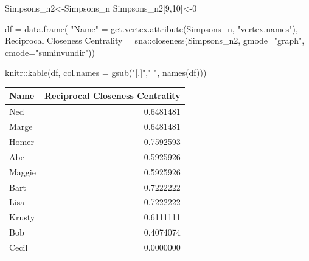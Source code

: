 \documentclass[
  notitlepage,
  onecolumn,
  openany]{book}
\newenvironment{Shaded}{\begin{snugshade}}{\end{snugshade}}
\newcommand{\AttributeTok}[1]{\textcolor[rgb]{0.77,0.63,0.00}{#1}}
\newcommand{\DecValTok}[1]{\textcolor[rgb]{0.00,0.00,0.81}{#1}}
\newcommand{\FunctionTok}[1]{\textcolor[rgb]{0.00,0.00,0.00}{#1}}
\newcommand{\NormalTok}[1]{#1}
\newcommand{\OtherTok}[1]{\textcolor[rgb]{0.56,0.35,0.01}{#1}}
\newcommand{\SpecialCharTok}[1]{\textcolor[rgb]{0.00,0.00,0.00}{#1}}
\newcommand{\StringTok}[1]{\textcolor[rgb]{0.31,0.60,0.02}{#1}}
\begin{document}
\begin{Shaded}
\begin{Highlighting}[]
\NormalTok{Simpsons\_n2}\OtherTok{\textless{}{-}}\NormalTok{Simpsons\_n}
\NormalTok{Simpsons\_n2[}\DecValTok{9}\NormalTok{,}\DecValTok{10}\NormalTok{]}\OtherTok{\textless{}{-}}\DecValTok{0}

\NormalTok{df }\OtherTok{=} \FunctionTok{data.frame}\NormalTok{(}
    \StringTok{"Name"} \OtherTok{=} \FunctionTok{get.vertex.attribute}\NormalTok{(Simpsons\_n, }\StringTok{"vertex.names"}\NormalTok{),}
    \StringTok{\textasciigrave{}}\AttributeTok{Reciprocal Closeness Centrality}\StringTok{\textasciigrave{}} \OtherTok{=}\NormalTok{ sna}\SpecialCharTok{::}\FunctionTok{closeness}\NormalTok{(Simpsons\_n2,}
                                                       \AttributeTok{gmode=}\StringTok{"graph"}\NormalTok{,}
                                                       \AttributeTok{cmode=}\StringTok{"suminvundir"}\NormalTok{))}

\NormalTok{knitr}\SpecialCharTok{::}\FunctionTok{kable}\NormalTok{(df, }\AttributeTok{col.names =} \FunctionTok{gsub}\NormalTok{(}\StringTok{"[.]"}\NormalTok{,}\StringTok{" "}\NormalTok{, }\FunctionTok{names}\NormalTok{(df)))}
\end{Highlighting}
\end{Shaded}

\begin{tabular}{l|r}
\hline
Name & Reciprocal Closeness Centrality\\
\hline
Ned & 0.6481481\\
\hline
Marge & 0.6481481\\
\hline
Homer & 0.7592593\\
\hline
Abe & 0.5925926\\
\hline
Maggie & 0.5925926\\
\hline
Bart & 0.7222222\\
\hline
Lisa & 0.7222222\\
\hline
Krusty & 0.6111111\\
\hline
Bob & 0.4074074\\
\hline
Cecil & 0.0000000\\
\hline
\end{tabular}
\end{document}
